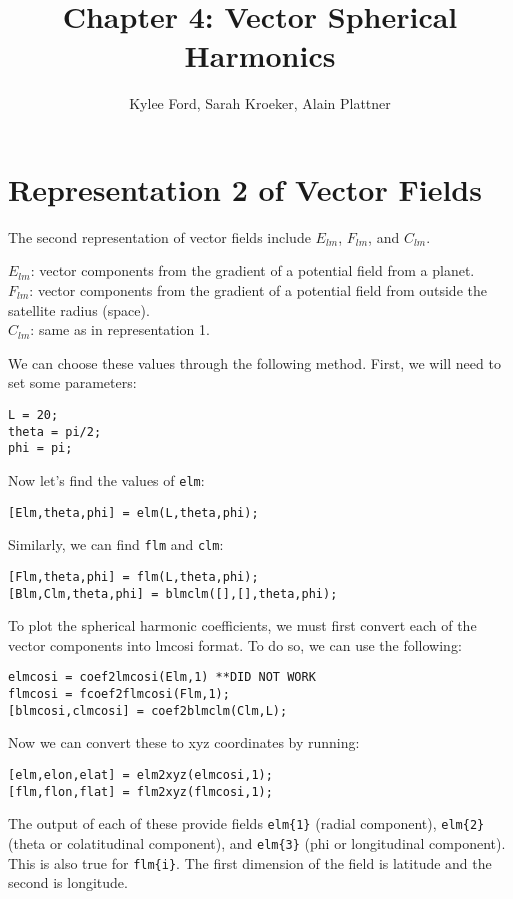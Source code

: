 \documentclass[11pt]{article}
\title{Chapter 4: Vector Spherical Harmonics}
\author{Kylee Ford, Sarah Kroeker, Alain Plattner}
\begin{document}
\maketitle

\section{Representation 2 of Vector Fields}

The second representation of vector fields include $E_{lm}$, $F_{lm}$, and $C_{lm}$.

$E_{lm}$: vector components from the gradient of a potential field from a planet. \\
$F_{lm}$: vector components from the gradient of a potential field from outside the satellite radius (space). \\
$C_{lm}$: same as in representation 1.

We can choose these values through the following method.  First, we will need to set some parameters:

\verb|L = 20;|\\
\verb|theta = pi/2;|\\
\verb|phi = pi;|

Now let's find the values of \verb|elm|:

\verb|[Elm,theta,phi] = elm(L,theta,phi);|

Similarly, we can find \verb|flm| and \verb|clm|:

\verb|[Flm,theta,phi] = flm(L,theta,phi);|\\
\verb|[Blm,Clm,theta,phi] = blmclm([],[],theta,phi);|

To plot the spherical harmonic coefficients, we must first convert each of the vector components into lmcosi format.  To do so, we can use the following:

\verb|elmcosi = coef2lmcosi(Elm,1) **DID NOT WORK|\\
\verb|flmcosi = fcoef2flmcosi(Flm,1);|\\
\verb|[blmcosi,clmcosi] = coef2blmclm(Clm,L);|

Now we can convert these to xyz coordinates by running:

\verb|[elm,elon,elat] = elm2xyz(elmcosi,1);|\\
\verb|[flm,flon,flat] = flm2xyz(flmcosi,1);|

The output of each of these provide fields \verb|elm{1}| (radial component), \verb|elm{2}| (theta or colatitudinal component), and \verb|elm{3}| (phi or longitudinal component).  This is also true for \verb|flm{i}|.  The first dimension of the field is latitude and the second is longitude.
\end{document}
